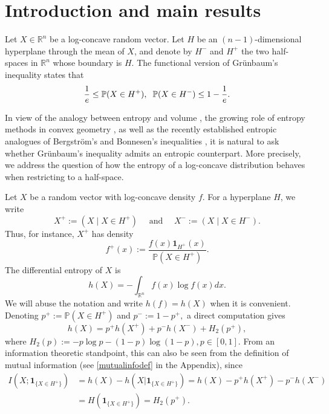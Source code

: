 \documentclass{article}
\theoremstyle{plain}
\theoremstyle{definition}
\newcommand{\RL}{\mathbb{R}}
\newcommand{\1}{\mathbf 1}
\begin{document}
\section{ Introduction and main results}

Let $X \in \RL^n$ be a log-concave random vector. Let $H$ be an $(n-1)$-dimensional hyperplane through the mean of $X$, and denote by $H^-$ and $H^+$ the two half-spaces in $\mathbb{R}^n$ whose boundary is $H$. The functional version of Gr{\"u}nbaum's inequality \cite{grunbaum} states that
\begin{equation} \label{grunbaumeq}
    \frac{1}{e} \leq \mathbb{P}(X\in H^+),\hspace{0.2cm} \mathbb{P}(X\in H^-) \leq 1-\frac{1}{e}.
\end{equation}


In view of the analogy between entropy and volume \cite{costacover, dembocoverthomas, FMMZ}, the growing role of entropy methods in convex geometry \cite{ bobkovmadiman, bourgains,klartagstrong}, as well as the recently established entropic analogues of Bergstr{\"o}m's and Bonnesen's inequalities \cite{bergstromisit}, it is natural to ask whether Gr{\"u}nbaum's inequality admits an entropic counterpart. More precisely, we address the question of how the entropy of a log-concave distribution behaves when restricting to a half-space.

Let $X$ be a random vector with log-concave density $f$. For a hyperplane $H$, we write
\[
    X^+:=(X\mid X\in H^+)
    \quad \text{ and } \quad
    X^-:=(X\mid X\in H^-).
\]
Thus, for instance, $X^+$ has density
\[
    f^+(x)
    :=
    \frac{f(x)\mathbf 1_{H^+}(x)}
         {\mathbb P(X\in H^+)}.
\]
The differential entropy of $X$ is 
$$
h(X) = -\int_{\mathbb R^n}f(x) \log f(x) dx.
$$
We will abuse the notation and write $h(f) = h(X)$ when it is convenient. Denoting $p^+ := \mathbb{P}(X\in H^+)$ and $p^- := 1-p^+,$ a direct computation gives
\begin{equation} \label{elementaryid}
    h(X) = p^+h(X^+) +p^-h(X^-) + H_2(p^+), 
\end{equation}
where $H_2(p) := -p\log{p} - (1-p)\log{(1-p)}, p \in [0,1]$.
From an information theoretic standpoint, this can also be seen from the definition of mutual information (see \eqref{mutualinfodef} in the Appendix), since
\begin{align} \label{plusminuseq}
I(X;\mathbf{1}_{\{X\in H^+\}}) &= h(X)-h(X|\mathbf{1}_{\{X\in H^+\}}) = h(X) - p^+h(X^+) -p^-h(X^-) \\ \label{IH}
&= H(\mathbf{1}_{\{X\in H^+\}}) = H_2(p^+).
\end{align}
\end{document}
